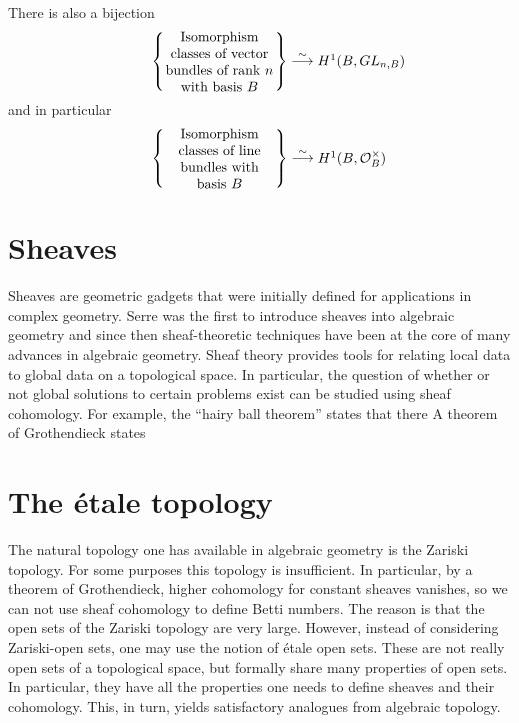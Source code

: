 There is also a bijection
\begin{align}
            \left\{ \parbox[c]{1.1in}{\centering
              Isomorphism classes of vector bundles of rank $n$ with basis $B$}
            \right\}
            \stackrel{\sim}{\longrightarrow}
            \parbox[c]{0.5in}{\centering
            $H^1(B, GL_{n,B})$}
\end{align}
and in particular
\begin{align}
            \left\{ \parbox[c]{1.1in}{\centering
            Isomorphism classes of line bundles with basis $B$}
            \right\}
            \stackrel{\sim}{\longrightarrow}
            \parbox[c]{0.5in}{\centering
                $H^1(B, \OO_B^\times)$}
\end{align}





\section{Sheaves}
Sheaves are geometric gadgets that were initially defined for applications in complex geometry. Serre was the first to introduce sheaves into algebraic geometry and since then sheaf-theoretic techniques have been at the core of many advances in algebraic geometry.  Sheaf theory provides tools for relating local data to global data on a topological space. In particular, the question of whether or not global solutions to certain problems exist can be studied using sheaf cohomology. For example, the ``hairy ball theorem'' states that there  A theorem of Grothendieck states

\section{The \'etale topology}
The natural topology one has available in algebraic geometry is the Zariski topology. For some purposes this topology is insufficient. In particular, by a theorem of Grothendieck, higher cohomology for constant sheaves vanishes, so we can not use sheaf cohomology to define Betti numbers. The reason is that the open sets of the Zariski topology are very large. However, instead of considering Zariski-open sets, one may use the notion of \'etale open sets. These are not really open sets of a topological space, but formally share many properties of open sets. In particular, they have all the properties one needs to define sheaves and their cohomology. This, in turn, yields satisfactory analogues from algebraic topology. 

